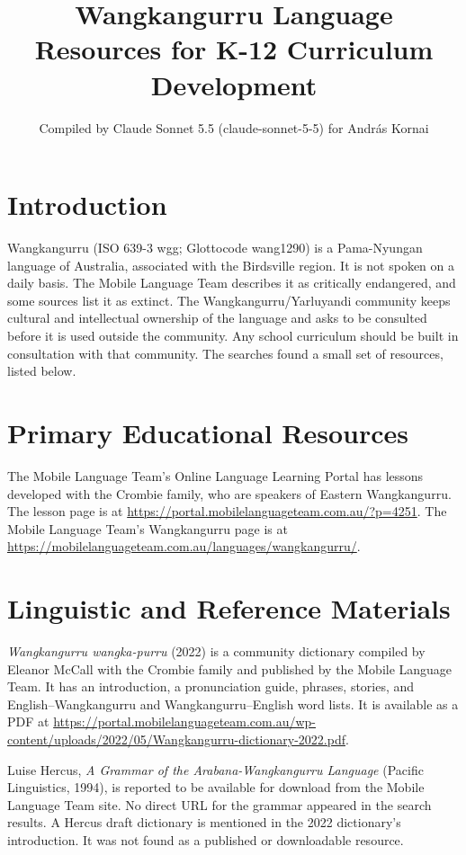 \documentclass[12pt]{article}
\title{Wangkangurru Language Resources for K-12 Curriculum Development}
\author{Compiled by Claude Sonnet 5.5 (claude-sonnet-5-5) for Andr\'as Kornai}
\date{}
\begin{document}
\maketitle

\section{Introduction}
Wangkangurru (ISO 639-3 wgg; Glottocode wang1290) is a Pama-Nyungan language of Australia, associated with the Birdsville region. It is not spoken on a daily basis. The Mobile Language Team describes it as critically endangered, and some sources list it as extinct. The Wangkangurru/Yarluyandi community keeps cultural and intellectual ownership of the language and asks to be consulted before it is used outside the community. Any school curriculum should be built in consultation with that community. The searches found a small set of resources, listed below.

\section{Primary Educational Resources}
The Mobile Language Team's Online Language Learning Portal has lessons developed with the Crombie family, who are speakers of Eastern Wangkangurru. The lesson page is at \url{https://portal.mobilelanguageteam.com.au/?p=4251}. The Mobile Language Team's Wangkangurru page is at \url{https://mobilelanguageteam.com.au/languages/wangkangurru/}.

\section{Linguistic and Reference Materials}
\emph{Wangkangurru wangka-purru} (2022) is a community dictionary compiled by Eleanor McCall with the Crombie family and published by the Mobile Language Team. It has an introduction, a pronunciation guide, phrases, stories, and English--Wangkangurru and Wangkangurru--English word lists. It is available as a PDF at \url{https://portal.mobilelanguageteam.com.au/wp-content/uploads/2022/05/Wangkangurru-dictionary-2022.pdf}.

Luise Hercus, \emph{A Grammar of the Arabana-Wangkangurru Language} (Pacific Linguistics, 1994), is reported to be available for download from the Mobile Language Team site. No direct URL for the grammar appeared in the search results. A Hercus draft dictionary is mentioned in the 2022 dictionary's introduction. It was not found as a published or downloadable resource.
\end{document}

